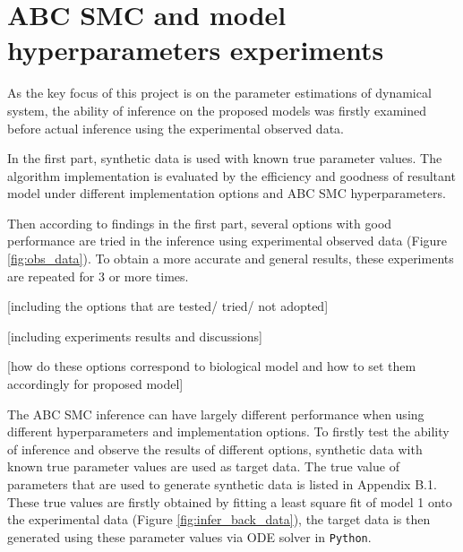 \documentclass[12pt,a4paper]{report}
\begin{document}








\section{ABC SMC and model hyperparameters experiments}

As the key focus of this project is on the parameter estimations of dynamical system, the ability of inference on the proposed models was firstly examined before actual inference using the experimental observed data.

In the first part, synthetic data is used with known true parameter values. The algorithm implementation is evaluated by the efficiency and goodness of resultant model under different implementation options and ABC SMC hyperparameters.

Then according to findings in the first part, several options with good performance are tried in the inference using experimental observed data (Figure \ref{fig:obs_data}). To obtain a more accurate and general results, these experiments are repeated for 3 or more times.

[including the options that are tested/ tried/ not adopted]

[including experiments results and discussions]

[how do these options correspond to biological model and how to set them accordingly for proposed model]

The ABC SMC inference can have largely different performance when using different hyperparameters and implementation options. To firstly test the ability of inference and observe the results of different options, synthetic data with known true parameter values are used as target data. The true value of parameters that are used to generate synthetic data is listed in Appendix B.1. These true values are firstly obtained by fitting a least square fit of model 1 onto the experimental data (Figure \ref{fig:infer_back_data}), the target data is then generated using these parameter values via ODE solver in \verb|Python|. 
\end{document}
